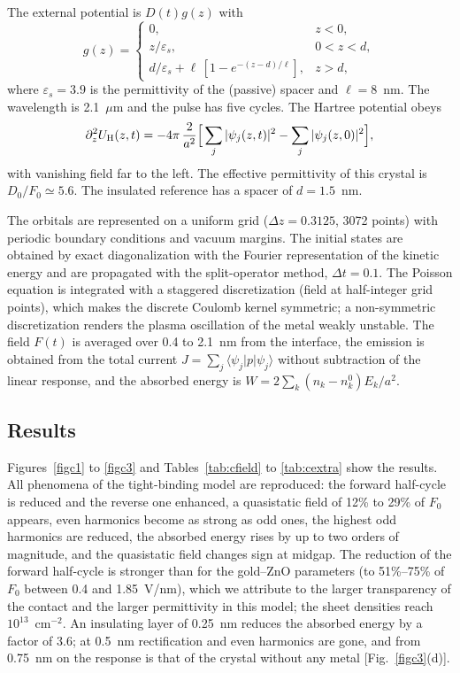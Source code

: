 \documentclass[aps,prl,onecolumn,superscriptaddress,notitlepage]{revtex4-2}
\begin{document}
The external potential is $D(t)g(z)$ with
\begin{equation}
g(z)=\begin{cases}0,& z<0,\\ z/\varepsilon_s, & 0<z<d,\\ d/\varepsilon_s+\ell\,[1-e^{-(z-d)/\ell}], & z>d,\end{cases}
\end{equation}
where $\varepsilon_s=3.9$ is the permittivity of the (passive) spacer and $\ell=8$~nm. The wavelength
is 2.1~$\mu$m and the pulse has five cycles. The Hartree potential obeys
\begin{equation}
\partial_z^2U_{\rm H}(z,t)=-4\pi\,\frac{2}{a^2}\Big[\sum_j|\psi_j(z,t)|^2-\sum_j|\psi_j(z,0)|^2\Big],
\end{equation}
with vanishing field far to the left. The effective permittivity of this crystal is
$D_0/F_0\simeq5.6$. The insulated reference has a spacer of $d=1.5$~nm.

The orbitals are represented on a uniform grid ($\Delta z=0.3125$, 3072 points) with periodic
boundary conditions and vacuum margins. The initial states are obtained by exact diagonalization with
the Fourier representation of the kinetic energy and are propagated with the split-operator method,
$\Delta t=0.1$. The Poisson equation is integrated with a staggered discretization (field at
half-integer grid points), which makes the discrete Coulomb kernel symmetric; a non-symmetric
discretization renders the plasma oscillation of the metal weakly unstable. The field $F(t)$ is
averaged over 0.4 to 2.1~nm from the interface, the emission is obtained from the total current
$J=\sum_j\langle\psi_j|p|\psi_j\rangle$ without subtraction of the linear response, and the absorbed
energy is $W=2\sum_k(n_k-n_k^0)E_k/a^2$.

\subsection{Results}
Figures~\ref{figc1} to \ref{figc3} and Tables~\ref{tab:cfield} to \ref{tab:cextra} show the results.
All phenomena of the tight-binding model are reproduced: the forward half-cycle is reduced and the
reverse one enhanced, a quasistatic field of 12\% to 29\% of $F_0$ appears, even harmonics become as
strong as odd ones, the highest odd harmonics are reduced, the absorbed energy rises by up to two
orders of magnitude, and the quasistatic field changes sign at midgap. The reduction of the forward
half-cycle is stronger than for the gold--ZnO parameters (to 51\%--75\% of $F_0$ between 0.4 and
1.85~V/nm), which we attribute to the larger transparency of the contact and the larger permittivity
in this model; the sheet densities reach $10^{13}$~cm$^{-2}$. An insulating layer of 0.25~nm reduces
the absorbed energy by a factor of 3.6; at 0.5~nm rectification and even harmonics are gone, and from
0.75~nm on the response is that of the crystal without any metal [Fig.~\ref{figc3}(d)].
\end{document}
